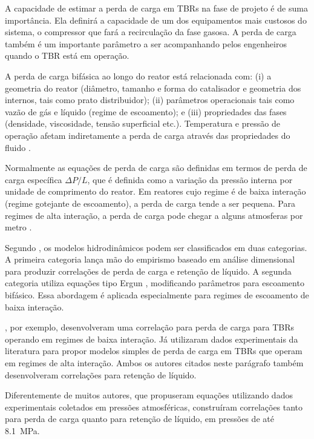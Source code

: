 A capacidade de estimar a perda de carga em TBRs na fase de projeto é de suma
importância. Ela definirá a capacidade de um dos equipamentos mais custosos do
sistema, o compressor que fará a recirculação da fase gasosa. A perda de carga
também é um importante parâmetro a ser acompanhando pelos engenheiros quando o
TBR está em operação.

A perda de carga bifásica ao longo do reator está relacionada com: (i) a
geometria do reator (diâmetro, tamanho e forma do catalisador e geometria dos
internos, tais como prato distribuidor); (ii) parâmetros operacionais tais como
vazão de gás e líquido (regime de escoamento); e (iii) propriedades das fases
(densidade, viscosidade, tensão superficial etc.). Temperatura e pressão de operação afetam
indiretamente a perda de carga através das propriedades do fluido
\cite{Ranade2011}.

Normalmente as equações de perda de carga são definidas em termos de perda de
carga específica $\Delta P/L$, que é definida como a variação da pressão interna
por unidade de comprimento do reator. Em reatores cujo regime é de baixa
interação (regime gotejante de escoamento), a perda de carga tende a ser
pequena. Para regimes de alta interação, a perda de carga pode chegar a alguns
atmosferas por metro \cite{Benkrid1997}.


Segundo , os modelos hidrodinâmicos podem ser
classificados em duas categorias. A primeira categoria lança mão do empirismo
baseado em análise dimensional para produzir correlações de perda de carga e
retenção de líquido. A segunda categoria utiliza equações tipo Ergun
, modificando parâmetros para escoamento bifásico.
Essa abordagem é aplicada especialmente para regimes de escoamento de baixa
interação.

, por exemplo, desenvolveram uma correlação para perda
de carga para TBRs operando em regimes de baixa interação. Já
 utilizaram dados experimentais  da literatura para
propor modelos simples de perda de carga em TBRs que operam em regimes de alta
interação. Ambos os autores citados neste parágrafo também desenvolveram
correlações para retenção de líquido.

Diferentemente de muitos autores, que propuseram equações utilizando dados
experimentais coletados em pressões atmosféricas, 
construíram correlações tanto para perda de carga quanto para retenção de
líquido, em pressões de até \SI{8.1}{MPa}.

